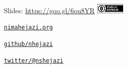 \documentclass[12pt,t]{beamer}
\begin{document}
\begin{frame}[c]{}

\Large
Slides: \href{https://goo.gl/6ou8YR}{https://goo.gl/6ou8YR} \quad
\includegraphics[height=5mm]{Figs/cc-zero.png}

\vspace{10mm}

\href{http://nimahejazi.org}{\tt nimahejazi.org}

\vspace{10mm}

\href{https://github.com/nhejazi}{\tt github/nhejazi}

\vspace{10mm}

\href{https://twitter.com/nshejazi}{\tt twitter/@nshejazi}



\end{frame}
\end{document}
